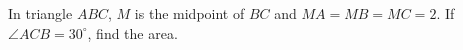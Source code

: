 In triangle $ABC$, $M$ is the midpoint of $BC$ and $MA=MB=MC=2$. If $\angle ACB=30^\circ$, find the area.

